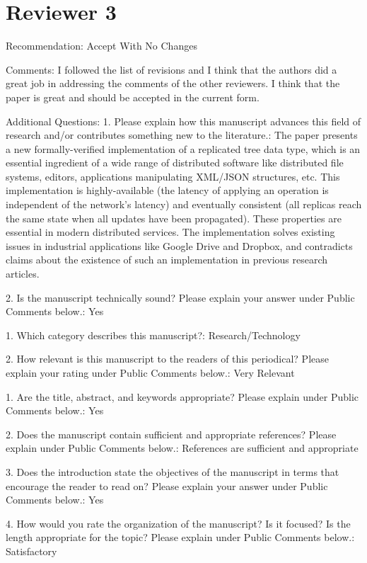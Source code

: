 \documentclass[10pt]{article}
\begin{document}
\section{Reviewer 3}

\begin{spverbatim}
Recommendation: Accept With No Changes

Comments:
I followed the list of revisions and I think that the authors did a great job in addressing the comments of the other reviewers. I think that the paper is great and should be accepted in the current form.

Additional Questions:
1.  Please explain how this manuscript advances this field of research and/or contributes something new to the literature.: The paper presents a new formally-verified implementation of a replicated tree data type, which is an essential ingredient of a wide range of distributed software like distributed file systems, editors, applications manipulating XML/JSON structures, etc. This implementation is highly-available (the latency of applying an operation is independent of the network’s latency) and eventually consistent (all replicas reach the same state when all updates have been propagated). These properties are essential in modern distributed services. The implementation solves existing issues in industrial applications like Google Drive and Dropbox, and contradicts claims about the existence of such an implementation in previous research articles.

2. Is the manuscript technically sound? Please explain your answer under Public Comments below.: Yes

1. Which category describes this manuscript?: Research/Technology

2. How relevant is this manuscript to the readers of this periodical? Please explain your rating under Public Comments below.: Very Relevant

1. Are the title, abstract, and keywords appropriate? Please explain under Public Comments below.: Yes

2. Does the manuscript contain sufficient and appropriate references? Please explain under Public Comments below.: References are sufficient and appropriate

3. Does the introduction state the objectives of the manuscript in terms that encourage the reader to read on? Please explain your answer under Public Comments below.: Yes

4. How would you rate the organization of the manuscript? Is it focused? Is the length appropriate for the topic? Please explain under Public Comments below.: Satisfactory


\end{spverbatim}
\end{document}

